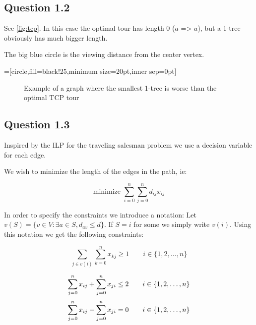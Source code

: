 \documentclass{sig-alternate}
\begin{document}
\subsection*{Question 1.2}
See \autoref{fig:tcp}. In this case the optimal tour has length $0$ ($a$ =>
$a$), but a 1-tree obviously has much bigger length.

The big blue circle is the viewing distance from the center vertex.

=[circle,fill=black!25,minimum size=20pt,inner sep=0pt]
\begin{figure}
\begin{center}
\end{center}
\caption{Example of a graph where the smallest 1-tree is worse than the
    optimal TCP tour}
\label{fig:tcp}
\end{figure}

\subsection*{Question 1.3}
Inspired by the ILP for the traveling salesman problem we use a decision
variable for each edge.

We wish to minimize the length of the edges in the path, ie:

\begin{equation}
    \text{minimize } \sum_{i=0}^{n}\sum_{j=0}^{n} d_{ij}x_{ij}
\end{equation}

In order to specify the constraints we introduce a notation: Let $v(S) =
\{v\in V : \exists a\in S, d_{av} \le d\}$. If $S = i$ for some we simply
write $v(i)$. Using this notation we get the following constraints:

\begin{equation}
    \label{eqn:vicinity}
    \sum_{j \in v(i)} \sum_{k = 0}^{n} x_{kj} \geq 1
    \qquad i\in \{1, 2, \ldots, n\}
\end{equation}

\begin{equation}
    \label{eqn:degree}
    \sum_{j=0}^{n} x_{ij} + \sum_{j=0}^{n} x_{ji} \le 2
    \qquad i \in \{1,2,\ldots,n\} \\
\end{equation}
\begin{equation}
    \label{eqn:degree2}
    \sum_{j=0}^{n} x_{ij} - \sum_{j=0}^{n} x_{ji} = 0
    \qquad i \in \{1,2,\ldots,n\} \\
\end{equation}
\end{document}
